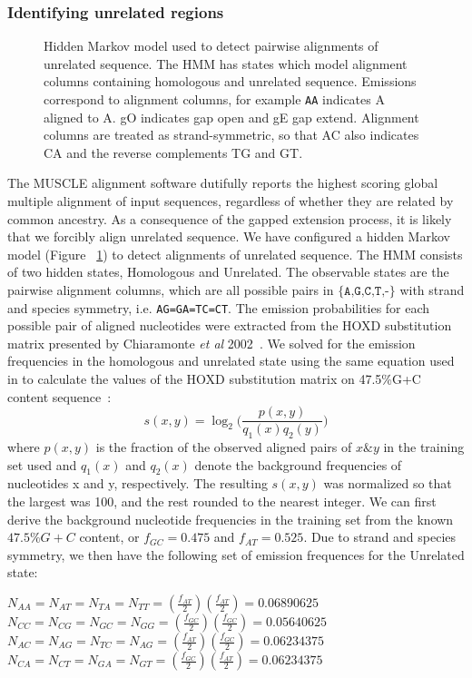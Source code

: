 \documentclass{ws-procs975x65}
\begin{document}
\subsubsection{Identifying unrelated regions}
\begin{figure}[t]
\centering {}
\caption{Hidden Markov model used to detect pairwise alignments of unrelated sequence. The HMM has states which model alignment columns containing homologous and unrelated sequence.  Emissions correspond to alignment columns, for example \texttt{AA} indicates A aligned to A.  gO indicates gap open and gE gap extend. Alignment columns are treated as strand-symmetric, so that AC also indicates CA and the reverse complements TG and GT.}
\label{fig-hmm}\vspace{-0.2cm}
\end{figure}
The MUSCLE alignment software dutifully reports the highest scoring global multiple alignment of input sequences, regardless of whether they are related by common ancestry. As a consequence of the gapped extension process, it is likely that we forcibly align unrelated sequence. We have configured a hidden Markov model (Figure ~\ref{fig-hmm}) to detect alignments of unrelated sequence. The HMM consists of two hidden states, Homologous and Unrelated. The observable states are the pairwise alignment columns, which are all possible pairs in $\texttt{{\{A,G,C,T,-\}}}$ with strand and species symmetry, i.e. \texttt{AG=GA=TC=CT}.  The emission probabilities for each possible pair of aligned nucleotides were extracted from the HOXD substitution matrix presented by Chiaramonte \textit{et al} 2002~\cite{hoxd}. We solved for the emission frequencies in the homologous and unrelated state using the same equation used in to calculate the values of the HOXD substitution matrix on 47.5\%G+C content sequence~\cite{hoxd}:
\begin{equation}
s(x,y)= \log_{2}{\Bigg(\frac{p(x,y)}{q_{1}(x)q_{2}(y)}\Bigg)}
\end{equation}
where $p(x,y)$ is the fraction of the observed aligned pairs of $x\&y$ in the training set used and $q_{1}(x)$ and $q_{2}(x)$ denote the background frequencies of nucleotides x and y, respectively. The resulting $s(x,y)$ was normalized so that the largest was 100, and the rest rounded to the nearest integer. We can first derive the background nucleotide frequencies in the training set from the known $47.5\%G+C$ content, or $f_{GC}=0.475$ and $f_{AT}=0.525$. Due to strand and species symmetry, we then have the following set of emission frequences for the Unrelated state: \begin{center}$N_{AA}=N_{AT}=N_{TA}=N_{TT}=(\frac{f_{AT}}{2})(\frac{f_{AT}}{2}) = 0.06890625$ \\
$N_{CC}=N_{CG}=N_{GC}=N_{GG}=(\frac{f_{GC}}{2})(\frac{f_{GC}}{2}) = 0.05640625$ \\
$N_{AC}=N_{AG}=N_{TC}=N_{AG}=(\frac{f_{AT}}{2})(\frac{f_{GC}}{2}) = 0.06234375$ \\
$N_{CA}=N_{CT}=N_{GA}=N_{GT}=(\frac{f_{GC}}{2})(\frac{f_{AT}}{2}) = 0.06234375$ \\
\end{center}
\end{document}
